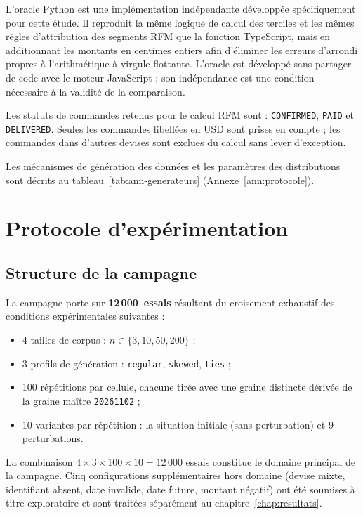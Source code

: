 L'oracle Python est une implémentation indépendante développée spécifiquement pour
cette étude. Il reproduit la même logique de calcul des terciles et les mêmes règles
d'attribution des segments RFM que la fonction TypeScript, mais en additionnant les
montants en centimes entiers afin d'éliminer les erreurs d'arrondi propres à
l'arithmétique à virgule flottante. L'oracle est développé sans partager de code avec
le moteur JavaScript ; son indépendance est une condition nécessaire à la validité de
la comparaison.

Les statuts de commandes retenus pour le calcul RFM sont : \texttt{CONFIRMED},
\texttt{PAID} et \texttt{DELIVERED}. Seules les commandes libellées en USD sont prises
en compte ; les commandes dans d'autres devises sont exclues du calcul sans lever
d'exception.

Les mécanismes de génération des données et les paramètres des distributions sont
décrits au tableau~\ref{tab:ann-generateurs} (Annexe~\ref{ann:protocole}).

\section{Protocole d'expérimentation}
\label{sec:methodes-protocole}

\subsection{Structure de la campagne}
\label{subsec:methodes-structure}

La campagne porte sur \textbf{12\,000~essais} résultant du croisement exhaustif des
conditions expérimentales suivantes :

\begin{itemize}
  \item 4 tailles de corpus : $n \in \{3, 10, 50, 200\}$ ;
  \item 3 profils de génération : \texttt{regular}, \texttt{skewed}, \texttt{ties} ;
  \item 100 répétitions par cellule, chacune tirée avec une graine distincte dérivée
    de la graine maître \texttt{20261102} ;
  \item 10 variantes par répétition : la situation initiale (sans perturbation) et
    9 perturbations.
\end{itemize}

La combinaison $4 \times 3 \times 100 \times 10 = 12\,000$ essais constitue le domaine
principal de la campagne. Cinq configurations supplémentaires hors domaine (devise mixte,
identifiant absent, date invalide, date future, montant négatif) ont été soumises à titre
exploratoire et sont traitées séparément au chapitre~\ref{chap:resultats}.

